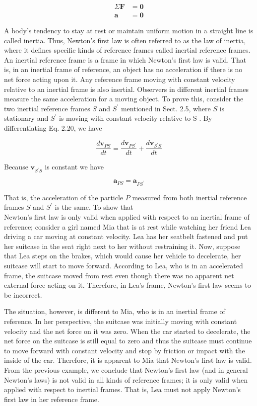 \documentclass[10pt]{article}
\begin{document}
$$
\begin{aligned}
\Sigma \mathbf{F} & =\mathbf{0} \\
\mathbf{a} & =\mathbf{0}
\end{aligned}
$$

A body's tendency to stay at rest or maintain uniform motion in a straight line is called inertia. Thus, Newton's first law is often referred to as the law of inertia, where it defines specific kinds of reference frames called inertial reference frames. An inertial reference frame is a frame in which Newton's first law is valid. That is, in an inertial frame of reference, an object has no acceleration if there is no net force acting upon it. Any reference frame moving with constant velocity relative to an inertial frame is also inertial. Observers in different inertial frames measure the same acceleration for a moving object. To prove this, consider the two inertial reference frames $S$ and $S^{\prime}$ mentioned in Sect. 2.5, where $S$ is stationary and $S^{\prime}$ is moving with constant velocity relative to S . By differentiating Eq. 2.20, we have

$$
\frac{d \mathbf{v}_{P S}}{d t}=\frac{d \mathbf{v}_{P S^{\prime}}}{d t}+\frac{d \mathbf{v}_{S^{\prime} S}}{d t}
$$

Because $\mathbf{v}_{S^{\prime} S}$ is constant we have

$$
\mathbf{a}_{P S}=\mathbf{a}_{P S^{\prime}}
$$

That is, the acceleration of the particle $P$ measured from both inertial reference frames $S$ and $S^{\prime}$ is the same. To show that\\
Newton's first law is only valid when applied with respect to an inertial frame of reference; consider a girl named Mia that is at rest while watching her friend Lea driving a car moving at constant velocity. Lea has her seatbelt fastened and put her suitcase in the seat right next to her without restraining it. Now, suppose that Lea steps on the brakes, which would cause her vehicle to decelerate, her suitcase will start to move forward. According to Lea, who is in an accelerated frame, the suitcase moved from rest even though there was no apparent net external force acting on it. Therefore, in Lea's frame, Newton's first law seems to be incorrect.

The situation, however, is different to Mia, who is in an inertial frame of reference. In her perspective, the suitcase was initially moving with constant velocity and the net force on it was zero. When the car started to decelerate, the net force on the suitcase is still equal to zero and thus the suitcase must continue to move forward with constant velocity and stop by friction or impact with the inside of the car. Therefore, it is apparent to Mia that Newton's first law is valid. From the previous example, we conclude that Newton's first law (and in general Newton's laws) is not valid in all kinds of reference frames; it is only valid when applied with respect to inertial frames. That is, Lea must not apply Newton's first law in her reference frame.
\end{document}
